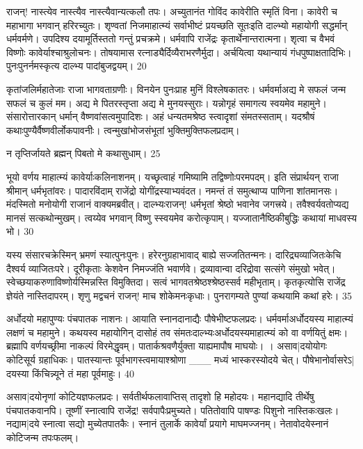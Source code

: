  
राजन्! नास्त्येव नास्त्यैव नास्त्यैवान्यत्कलौ तपः।
 अच्युतानंत गोविंद कावेरीति स्मृतिं विना।
 कावेरी च महाभागा भगवान् हरिरच्युतः।
 शृण्वतां निजमाहात्म्यं सर्वाभीष्टं प्रयच्छति सूतःइति दाल्भ्यो महायोगी सद्धर्मान् धर्मवर्मणे।
 उपदिश्य दयामूर्तिस्ततो गन्तुं प्रचक्रमे।
 धर्मवापि राजेंद्रः कृतार्थेनान्तरात्मना।
 शृत्वा च वैभवं विष्णोः कावेर्याश्चाश्रुलोचनः।
 तोषयामास रत्नाड्यैर्दिव्यैराभरणैर्मुदा।
 अर्चयित्वा यथान्यायं गंधपुष्पाक्षतादिभिः।
 पुनःपुनर्नमस्कृत्य दाल्भ्य पादांबुजद्वयम्।
 20

  कृतांजलिर्महातेजाः राजा भागवताग्रणीः।
 विनयेन पुनःप्राह मुनिं विश्लेषकातरः।
 धर्मवर्माअद्य मे सफलं जन्म सफलं च कुलं मम।
 अद्य मे पितरस्तृप्ता अद्य मे मुनयस्सुराः।
 यन्नोगृहं समागत्य स्वयमेव महामुने।
 संसारोत्तारकान् धर्मान् वैष्णवांसत्वमुपादिशः।
 अहं धन्यतमश्रेष्ठ स्त्वादृशां संमतस्सताम्।
 यदश्रौषं कथाःपुण्यैर्वैष्णवीर्लोकपावनीः।
 त्वन्मुखांभोजसंभूतां भुक्तिमुक्तिफलप्रदाम्।
 
न तृप्तिर्जायते ब्रह्मन् पिबतो मे कथासुधाम्।
25

 भूयो वर्णय माहात्म्यं कावेर्याःकलिनाशनम्।
 यच्छृत्वाहं गमिष्यामि तद्विष्णोःपरमपदम्।
 इति संप्रार्थयन् राजा श्रीमान् धर्मभृतांवरः।
 पादारविंदाम् राजेंद्रो योगींद्रस्याभ्यवंदत।
 नमन्तं तं समुत्थाप्य पाणिना शांतमानसः।
 मंदस्मितो मनोयोगी राजानं वाक्यमब्रवीत्।
 दाल्भ्यःराजन्! धर्मभृतां श्रेष्ठो भवानेव जगत्त्रये।
 तवैश्वर्यवतोप्यद्य मानसं सत्कथोन्मुखम्।
 त्वय्येव भगवान् विष्णु स्स्वयमेव करोत्कृपाम्।
 यज्जातानैष्ठिकीबुद्धिः कथायां माधवस्य भो।
 30

  यस्य संसारचक्रेस्मिन् भ्रमणं स्यात्पुनःपुनः।
 हरेरनुग्रहाभावाद् बाह्ये सज्जतितन्मनः।
 दारिद्र्यव्याजितःकेचि दैश्वर्य व्याजितःपरे।
 दूरीकृताः केशवेन निमज्जंति भवार्णवे।
 द्रव्यावान्वा दरिद्रोवा सत्संगे संमुखो भवेत्।
 स्वेच्छयाकरुणाविष्णोर्यस्मिन्नस्ति विमुक्तिदा।
 सत्वं भागवतश्रेष्ठश्श्रेष्ठस्सर्व महीभृताम्।
 कृतकृत्योसि राजेंद्र ज्ञेयंते नास्तिदापरम्।
 शृणु मद्वचनं राजन्! माच शोकेमनःकृधाः।
 पुनरागम्यते पुण्यां कथयामि कथां हरेः।
 35

 
अर्धोदयो महापुण्यः पंचपातक नाशनः।
 आयाति स्नानदानाद्यैः पौषेभीष्टफलप्रदः।
 धर्मवर्माअर्धोदयस्य माहात्म्यं लक्षणं च महामुने।
 कथयस्व महायोगिन् दासोहं तव संमतःदाल्भ्यःअर्धोदयस्यमाहात्म्यं को वा वर्णयितुं क्षमः।
 ब्रह्मापि वर्णयच्छ्रीमा नाकल्पं विरमेद्धृवम्।
 पातार्कश्रवणैर्युक्ता याह्यमापौष माघयोः।
 ।
 असाव|दयोयोगः कोटिसूर्य ग्रहाधिकः।
 पातस्यान्तः पूर्वभागस्त्वमायाश्श्रोणा
___ मध्यं भास्करस्योदये चेत्।
 पौषेभानोर्वासरेऽ|दयस्या किंचिन्न्यूने
तं महा पूर्वमाहुः।
 40

  असाव|दयोनृणां कोटियज्ञफलप्रदः।
 सर्वतीर्थफलावाप्तिस् तादृशो हि महोदयः।
 महानद्यादि तीर्थेषु पंचपातकवानपि।
 तूष्णीं स्नात्वापि राजेंद्र! सर्वपापैःप्रमुच्यते।
 पतितोवापि पाषण्डः पिशुनो नास्तिकःखलः।
 नद्याम|दये स्नात्वा सद्यो मुच्येतपातकैः।
 स्नानं तुलार्के कावेर्यां प्रयागे माघमज्जनम्।
 नेतावोदयेस्नानं कोटिजन्म तपःफलम्।
 
